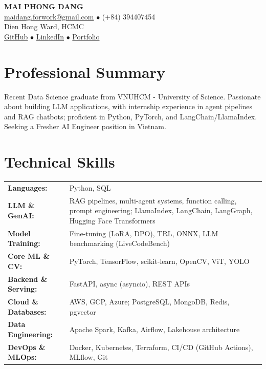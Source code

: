 \documentclass[a4paper,10pt]{article}
\begin{document}
\begin{center}
  {\LARGE\bfseries MAI PHONG DANG} \\[0.2em]
  \href{mailto:maidang.forwork@gmail.com}{\color{darkblue}maidang.forwork@gmail.com} $\bullet$ (+84) 394407454 \\[0.1em]
  Dien Hong Ward, HCMC \\[0.1em]
  \href{https://github.com/theAbyssOfTime2004}{\color{darkblue}GitHub} $\bullet$
  \href{https://www.linkedin.com/in/mai-%C4%91%C4%83ng-124b13302/}{\color{darkblue}LinkedIn} $\bullet$
  \href{https://theabyssoftime2004.github.io/}{\color{darkblue}Portfolio}
\end{center}

\vspace{-0.1em}

\section{Professional Summary}
Recent Data Science graduate from VNUHCM - University of Science. Passionate about building LLM applications, with internship experience in agent pipelines and RAG chatbots; proficient in Python, PyTorch, and LangChain/LlamaIndex. Seeking a Fresher AI Engineer position in Vietnam.

\section{Technical Skills}
\begin{tabularx}{\textwidth}{@{}l >{\raggedright\arraybackslash}X@{}}
\textbf{Languages:} & Python, SQL \\
\textbf{LLM \& GenAI:} & RAG pipelines, multi-agent systems, function calling, prompt engineering; LlamaIndex, LangChain, LangGraph, Hugging Face Transformers \\
\textbf{Model Training:} & Fine-tuning (LoRA, DPO), TRL, ONNX, LLM benchmarking (LiveCodeBench) \\
\textbf{Core ML \& CV:} & PyTorch, TensorFlow, scikit-learn, OpenCV, ViT, YOLO \\
\textbf{Backend \& Serving:} & FastAPI, async (asyncio), REST APIs \\
\textbf{Cloud \& Databases:} & AWS, GCP, Azure; PostgreSQL, MongoDB, Redis, pgvector \\
\textbf{Data Engineering:} & Apache Spark, Kafka, Airflow, Lakehouse architecture \\
\textbf{DevOps \& MLOps:} & Docker, Kubernetes, Terraform, CI/CD (GitHub Actions), MLflow, Git \\
\end{tabularx}
\end{document}

